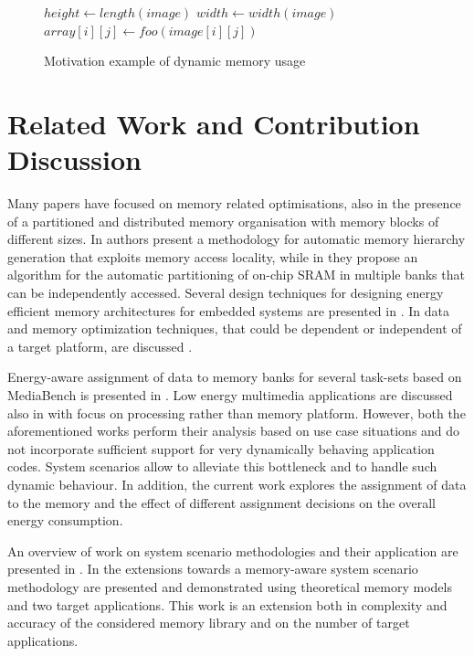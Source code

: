 \documentclass[a4paper,conference]{IEEEtran}
\begin{document}
\begin{figure}[!t]
\begin{algorithmic}
	\STATE $height \gets length(image)$
	\STATE $width \gets width(image)$
			\STATE $array[i][j] \gets foo(image[i][j])$
		\ENDFOR
	\ENDFOR
\ENDWHILE
\end{algorithmic}
\caption{Motivation example of dynamic memory usage}
\label{fig:motivation}
\end{figure}

\section{Related Work and Contribution Discussion}
\label{sec:related}

Many papers have focused on memory related optimisations, also in the presence of a partitioned and distributed memory organisation with memory blocks of different sizes. In \cite{Ben00b} authors present a methodology for automatic memory hierarchy generation that exploits memory access locality, while in \cite{Ben00c} they propose an algorithm for the automatic partitioning of on-chip SRAM in multiple banks that can be independently accessed. Several design techniques for designing energy efficient memory architectures for embedded systems are presented in \cite{Mac02}. In \cite{Pgk01} data and memory optimization techniques, that could be dependent or independent of a target platform, are discussed . 

Energy-aware assignment of data to memory banks for several task-sets based on MediaBench is presented in \cite{Mar03}. Low energy multimedia applications are discussed also in \cite{Chu02} with focus on processing rather than memory platform. However, both the aforementioned works perform their analysis based on use case situations and do not incorporate sufficient support for very dynamically behaving application codes. System scenarios allow to alleviate this bottleneck and to handle such dynamic behaviour. In addition, the current work explores the assignment of data to the memory and the effect of different assignment decisions on the overall energy consumption.

An overview of work on system scenario methodologies and their application are presented in \cite{Gheorghita2007}. In \cite{Fil12} the extensions towards a memory-aware system scenario methodology are presented and demonstrated using theoretical memory models and two target applications. This work is an extension both in complexity and accuracy of the considered memory library and on the number of target applications. 
\end{document}
